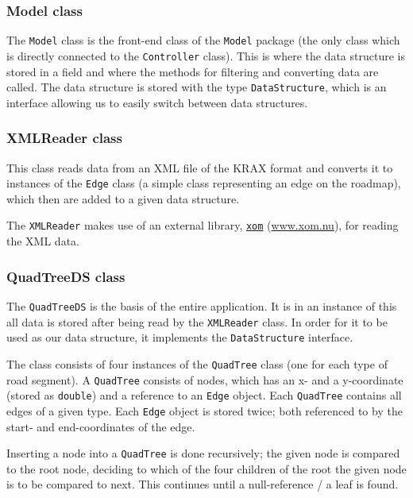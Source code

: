 \documentclass[a4paper,11pt]{article}
\begin{document}
\subsubsection{Model class} %
The \texttt{Model} class is the front-end class of the \texttt{Model} package (the only class which is directly connected to the \texttt{Controller} class). This is where the data structure is stored in a field and where the methods for filtering and converting data are called. The data structure is stored with the type \texttt{DataStructure}, which is an interface allowing us to easily switch between data structures.

\subsubsection{XMLReader class} %
This class reads data from an XML file of the KRAX format and converts it to instances of the \texttt{Edge} class (a simple class representing an edge on the roadmap), which then are added to a given data structure.

The \texttt{XMLReader} makes use of an external library, \href{www.xom.nu}{\texttt{xom}} (\url{www.xom.nu}), for reading the XML data.

\subsubsection{QuadTreeDS class} %
The \texttt{QuadTreeDS} is the basis of the entire application. It is in an instance of this all data is stored after being read by the \texttt{XMLReader} class. In order for it to be used as our data structure, it implements the \texttt{DataStructure} interface.

The class consists of four instances of the \texttt{QuadTree} class (one for each type of road segment). A \texttt{QuadTree} consists of nodes, which has an x- and a y-coordinate (stored as \texttt{double}) and a reference to an \texttt{Edge} object. Each \texttt{QuadTree} contains all edges of a given type. Each \texttt{Edge} object is stored twice; both referenced to by the start- and end-coordinates of the edge.

Inserting a node into a \texttt{QuadTree} is done recursively; the given node is compared to the root node, deciding to which of the four children of the root the given node is to be compared to next. This continues until a null-reference / a leaf is found.
\end{document}
